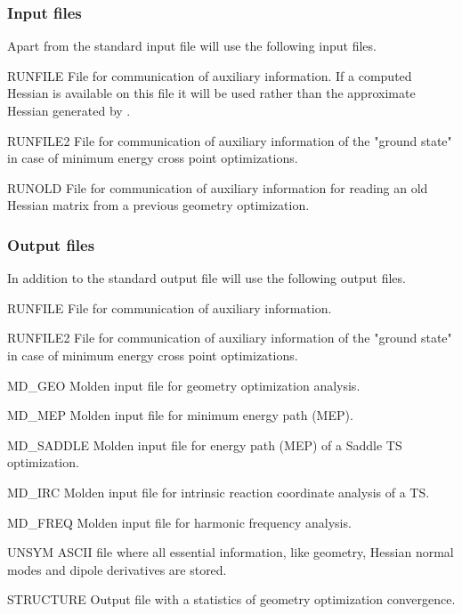 \subsubsection{Input files}
Apart from the standard input file  will use the following input
files.

\begin{filelist}
\item[RUNFILE]
File for communication of auxiliary information. If a computed Hessian is available on this file it will be used rather than
the approximate Hessian generated by .
\item[RUNFILE2]
File for communication of auxiliary information of the "ground state" in case of minimum energy cross point optimizations.
\item[RUNOLD]
File for communication of auxiliary information for reading an old Hessian matrix from a previous geometry optimization.
\end{filelist}


\subsubsection{Output files}
In addition to the standard output file  will use the following output
files.

\begin{filelist}
\item[RUNFILE]
File for communication of auxiliary information.
\item[RUNFILE2]
File for communication of auxiliary information of the "ground state" in case of minimum energy cross point optimizations.
\item[MD\_GEO]
Molden input file for geometry optimization analysis.
\item[MD\_MEP]
Molden input file for minimum energy path (MEP).
\item[MD\_SADDLE]
Molden input file for energy path (MEP) of a Saddle TS optimization.
\item[MD\_IRC]
Molden input file for intrinsic reaction coordinate analysis of a TS.
\item[MD\_FREQ]
Molden input file for harmonic frequency analysis.
\item[UNSYM]
ASCII file where all essential information, like geometry, Hessian normal modes and dipole
derivatives are stored.
\item[STRUCTURE]
Output file with a statistics of geometry optimization convergence.
\end{filelist}

